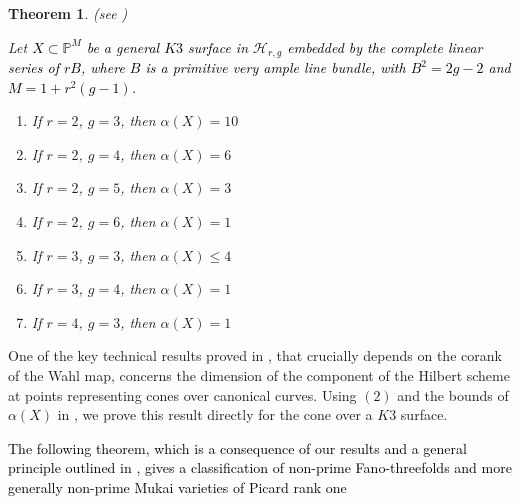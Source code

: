\documentclass[11pt,twoside]{amsart}
\theoremstyle{plain}
\numberwithin{equation}{section}
\newtheorem{theorem}{Theorem}[section]
\theoremstyle{definition}
\begin{document}
\begin{theorem}(see )\label{ZL for lower genus $K3$ surfaces intro}

Let \textcolor{black}{$X \subset \mathbb{P}^{M}$ be a general $K3$ surface in $\mathcal{H}_{r,g}$ embedded by the complete linear series of $rB$, where $B$ is a primitive very ample line bundle, with $B^2 = 2g-2$ and $M = 1+r^2(g-1)$.}

    \begin{enumerate}
        \item If $r = 2$, $g = 3$, then $\alpha(X) = 10$ 
        \item If $r = 2$, $g = 4$, then $\alpha(X) = 6$ 
        \item If $r = 2$, $g = 5$, then $\alpha(X) = 3$ 
        \item If $r = 2$, $g = 6$, then $\alpha(X) = 1$ 
        \item If $r = 3$, $g = 3$, then $\alpha(X) \leq 4$
        \item If $r = 3$, $g = 4$, then $\alpha(X) = 1$ 
        \item If $r = 4$, $g = 3$, then $\alpha(X) = 1$
        
       
        
    \end{enumerate}
    
\end{theorem}

One of the key technical results proved in \cite{CLM98}, that crucially depends on the corank of the Wahl map, concerns the dimension of the component of the Hilbert scheme at points representing cones over canonical curves. Using  $(2)$ and the bounds of $\alpha(X)$ in , we prove this result directly for the cone over a $K3$ surface. \par
\textcolor{black}{The following theorem, which is a consequence of our results and a general principle outlined in \cite{CLM98}, gives a classification of non-prime Fano-threefolds and more generally non-prime Mukai varieties of Picard rank one} 
\end{document}
